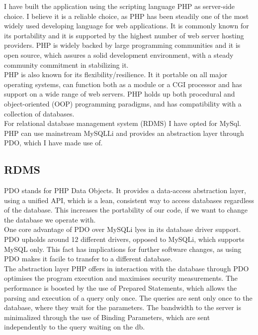 I have built the application using the scripting language PHP as server-side choice. I believe it is a reliable choice, as PHP has been steadily one of the most widely used developing language for web applications. It is commonly known for its portability and it is supported by the highest number of web server hosting providers. 
PHP is widely backed by large programming communities and it is open source, which assures a solid development environment, with a steady community commitment in stabilizing it.\\ 

PHP is also known for its flexibility/resilience. It it portable on all major operating systems, can function both as a module or a CGI processor and has support on a wide range of web servers. PHP  holds up both procedural and object-oriented (OOP) programming paradigms, and has compatibility with a collection of databases.\\ 

For relational database management system (RDMS) I have opted for MySql. PHP can use mainstream MySQLLi and provides an abstraction layer through PDO, which I have made use of.

\subsection{RDMS} 

PDO stands for PHP Data Objects. It provides a data-access abstraction layer, using a unified API, which is a lean, consistent way to access databases regardless of the database. This increases the portability of our code, if we want to change the database we operate with.\\

One core advantage of PDO over MySQLi lyes in its database driver support. PDO upholds around 12 different drivers, opposed to MySQLi, which supports MySQL only. This fact has implications for further software changes, as using PDO makes it facile to transfer to a different database.\\  

The abstraction layer PHP offers in interaction with the database through PDO optimises the program execution and maximises security measurements.
The performance is boosted by the use of Prepared Statements, which allows the parsing and execution of a query only once. The queries are sent only once to the database, where they wait for the parameters. The bandwidth to the server is minimalized through the use of Binding Parameters, which are sent independently to the query waiting on the db.\\ 


